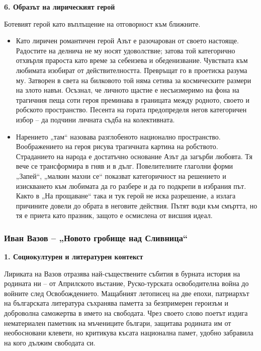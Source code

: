\documentclass[12pt,a4paper]{article}
\begin{document}
\vspace{0.1cm}
\textbf{6. Образът на лирическият герой}
\vspace{0.1cm}

\indent Ботевият герой като въплъщение на отговорност към ближните.

\vspace{0.1cm}
\begin{itemize}[leftmargin=*, noitemsep, topsep=2pt, parsep=0pt]
    \item Като лиричен романтичен герой Азът е разочарован от своето настояще. Радостите на делнича не му носят удоволствие; затова той категорично отхвърля прароста като време за себеизева и обеденизвание. Чувствата към любимата изобират от действителността. Превръщат го в проетиска разума му. Затворен в света на билковото той няма сетива за космическите размери на злото навън. Осъзнал, че личното щастие е несъизмеримо на фона на трагичния пеща соти героя преминава в границата между родното, своето и робското пространство. Песента на гората предопределя негов категоричен избор -- да подчини личната съдба на колективната.
    \vspace{0.1cm}
    \item Нарението „там“ назовава разглобеното национално пространство. Воображението на героя рисува трагичната картина на робството. Страданието на народа е достатъчно основание Азът да загърби любовта. Тя вече се трансформира в гняв и в дълг. Повелителните глаголни форми „Запей“, „малкин махни се“ показват категоричност на решението и изискването към любимата да го разбере и да го подкрепи в избрания път. Както в „На прощаване“ така и тук герой не иска разрешение, а излага причините довели до обрата в неговите действия. Пътят води към смъртта, но тя е приета като празник, защото е осмислена от висшия идеал.
\end{itemize}

\newpage

\subsubsection{\colorbox{green!40}{Иван Вазов – „Новото гробище над Сливница“}}
\textbf{1. Социокултурен и литературен контекст}
\vspace{0.1cm}

\indent Лириката на Вазов отразява най-съществените събития в бурната история на родината ни – от Априлското въстание, Руско-турската освободителна война до войните след Освобождението. Мащабният летописец на две епохи, патриархът на българската литература съхранява паметта за безпримерен героизъм и доброволна саможертва в името на свободата. Чрез своето слово поетът издига нематериален паметник на мъчениците българи, защитава родината им от необосновани клевети, но критикува късата национална памет, удобно забравила на кого дължим свободата си.
\end{document}
